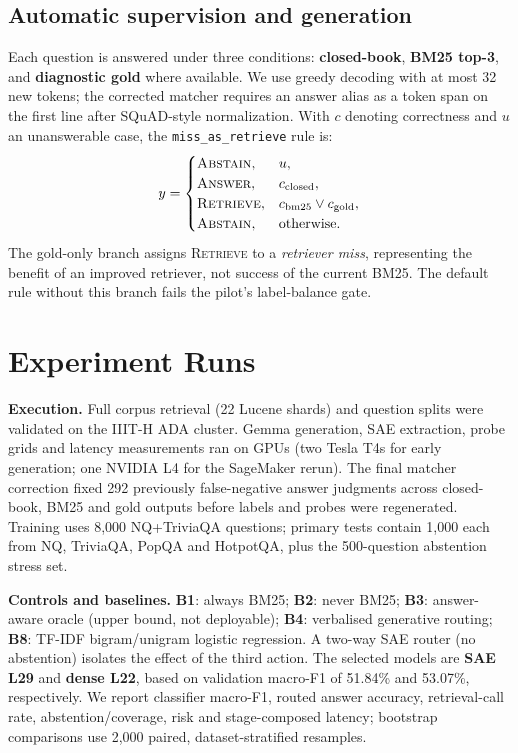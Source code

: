 \documentclass[11pt,a4paper,twocolumn]{article}
\begin{document}
\subsection{Automatic supervision and generation}
Each question is answered under three conditions: \textbf{closed-book}, \textbf{BM25 top-3}, and \textbf{diagnostic gold} where available. We use greedy decoding with at most 32 new tokens; the corrected matcher requires an answer alias as a token span on the first line after SQuAD-style normalization. With $c$ denoting correctness and $u$ an unanswerable case, the \texttt{miss\_as\_retrieve} rule is:
\begin{equation}
 y=\begin{cases}
 \textsc{Abstain}, &u,\\
 \textsc{Answer}, &c_{\rm closed},\\
 \textsc{Retrieve}, &c_{\rm bm25}\lor c_{\rm gold},\\
 \textsc{Abstain}, &\text{otherwise.}
 \end{cases}\label{eq:label}
\end{equation}
The gold-only branch assigns \textsc{Retrieve} to a \emph{retriever miss}, representing the benefit of an improved retriever, not success of the current BM25. The default rule without this branch fails the pilot's label-balance gate.

\section{Experiment Runs}
\textbf{Execution.} Full corpus retrieval (22 Lucene shards) and question splits were validated on the IIIT-H ADA cluster. Gemma generation, SAE extraction, probe grids and latency measurements ran on GPUs (two Tesla T4s for early generation; one NVIDIA L4 for the SageMaker rerun). The final matcher correction fixed 292 previously false-negative answer judgments across closed-book, BM25 and gold outputs before labels and probes were regenerated. Training uses 8,000 NQ+TriviaQA questions; primary tests contain 1,000 each from NQ, TriviaQA, PopQA and HotpotQA, plus the 500-question abstention stress set.

\textbf{Controls and baselines.} \textbf{B1}: always BM25; \textbf{B2}: never BM25; \textbf{B3}: answer-aware oracle (upper bound, not deployable); \textbf{B4}: verbalised generative routing; \textbf{B8}: TF-IDF bigram/unigram logistic regression. A two-way SAE router (no abstention) isolates the effect of the third action. The selected models are \textbf{SAE L29} and \textbf{dense L22}, based on validation macro-F1 of 51.84\% and 53.07\%, respectively. We report classifier macro-F1, routed answer accuracy, retrieval-call rate, abstention/coverage, risk and stage-composed latency; bootstrap comparisons use 2,000 paired, dataset-stratified resamples.
\end{document}
